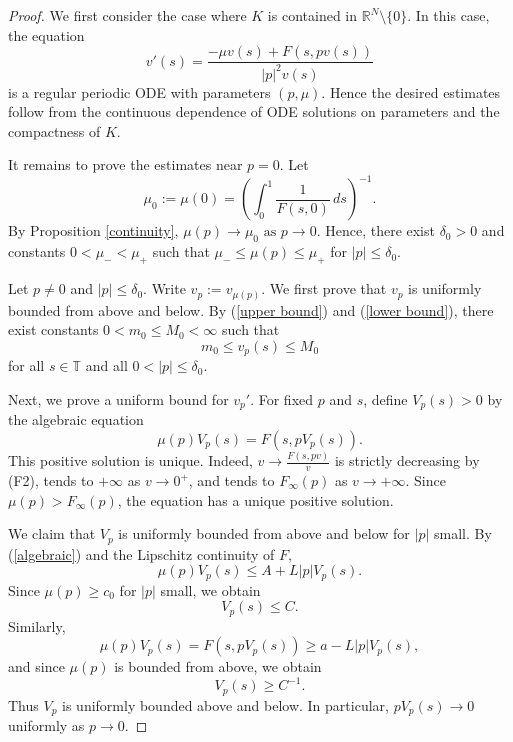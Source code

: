 \documentclass[preprint]{elsarticle}
\numberwithin{equation}{section}
\begin{document}
\begin{proof}
We first consider the case where $K$ is contained in $\mathbb R^N\setminus\{0\}$. In this case, the equation
\begin{equation*}
v'(s)=\frac{-\mu v(s)+F(s,pv(s))}{|p|^2v(s)}
\end{equation*}
is a regular periodic ODE with parameters $(p,\mu)$. Hence the desired estimates follow from the continuous dependence of ODE solutions on parameters and the compactness of $K$.

It remains to prove the estimates near $p=0$. Let
\begin{equation*}
\mu_0:=\mu(0)
=
\left(
\int_0^1\frac{1}{F(s,0)}\,ds
\right)^{-1}.
\end{equation*}
By Proposition \ref{continuity},
$
\mu(p)\to\mu_0
\text{ as }p\to0.
$
Hence, there exist $\delta_0>0$ and constants $0<\mu_-<\mu_+$ such that $\mu_-\le\mu(p)\le\mu_+$ for $|p|\le\delta_0$.

Let $p\ne0$ and $|p|\le\delta_0$. Write
$
v_p:=v_{\mu(p)}.
$
We first prove that $v_p$ is uniformly bounded from above and below. By (\ref{upper bound}) and (\ref{lower bound}), there exist constants $0<m_0\le M_0<\infty$ such that
\begin{equation*}
m_0\le v_p(s)\le M_0
\end{equation*}
for all $s\in\mathbb T$ and all $0<|p|\le\delta_0$.

Next, we prove a uniform bound for $v_p'$. For fixed $p$ and $s$, define $V_p(s)>0$ by the algebraic equation
\begin{equation}
\mu(p)V_p(s)=F(s,pV_p(s)).\label{algebraic}
\end{equation}
This positive solution is unique. Indeed,
$
v\to \frac{F(s,pv)}{v}
$
is strictly decreasing by \textup{(F2)}, tends to $+\infty$ as $v\to0^+$, and tends to $F_\infty(p)$ as $v\to+\infty$. Since $\mu(p)>F_\infty(p)$, the equation has a unique positive solution.

We claim that $V_p$ is uniformly bounded from above and below for $|p|$ small. By (\ref{algebraic}) and the Lipschitz continuity of $F$,
\begin{equation*}
\mu(p)V_p(s)
\le
A+L|p|V_p(s).
\end{equation*}
Since $\mu(p)\ge c_0$ for $|p|$ small, we obtain
\begin{equation}
V_p(s)\le C.
\end{equation}
Similarly,
\begin{equation}
\mu(p)V_p(s)
=
F(s,pV_p(s))
\ge
a-L|p|V_p(s),
\end{equation}
and since $\mu(p)$ is bounded from above, we obtain
\begin{equation*}
V_p(s)\ge C^{-1}.
\end{equation*}
Thus $V_p$ is uniformly bounded above and below. In particular,
$
pV_p(s)\to0
$
uniformly as $p\to0$.


\end{proof}
\end{document}
